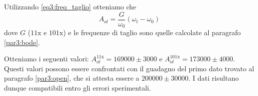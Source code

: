 Utilizzando \ref{eq3:freq_taglio} otteniamo che
$$A_{ol} = \frac{G}{\omega_0} (\omega_t - \omega_0)$$
dove $G$ ($11\mathrm{x}$ e $101\mathrm{x}$) e le frequenze di taglio sono quelle calcolate al paragrafo \ref{par3:bode}.

Otteniamo i seguenti valori: $A_{ol}^{11\mathrm{x}} = 169000 \pm 3000$ e $A_{ol}^{101\mathrm{x}} = 173000 \pm 4000$. Questi valori possono essere confrontati con il guadagno del primo dato trovato al paragrafo \ref{par3:open}, che si attesta essere a $200000 \pm 30000$. I dati risultano dunque compatibili entro gli errori sperimentali.
